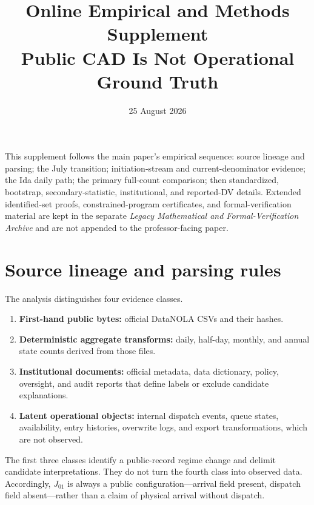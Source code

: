 \documentclass[11pt]{article}
\title{\vspace{-1.6em}\textbf{Online Empirical and Methods Supplement}\\[0.35em]
\large Public CAD Is Not Operational Ground Truth}
\author{}
\date{25 August 2026}
\begin{document}
\maketitle
\thispagestyle{plain}
\vspace{-1.2em}

\begin{plainbox}[title=Scope]
This supplement follows the main paper's empirical sequence: source lineage and parsing; the July transition; initiation-stream and current-denominator evidence; the Ida daily path; the primary full-count comparison; then standardized, bootstrap, secondary-statistic, institutional, and reported-DV details. Extended identified-set proofs, constrained-program certificates, and formal-verification material are kept in the separate \emph{Legacy Mathematical and Formal-Verification Archive} and are not appended to the professor-facing paper.
\end{plainbox}

\setcounter{tocdepth}{1}
\begingroup
\small
\tableofcontents
\endgroup
\newpage

\section{Source lineage and parsing rules}

The analysis distinguishes four evidence classes.
\begin{enumerate}
\item \textbf{First-hand public bytes:} official DataNOLA CSVs and their hashes.
\item \textbf{Deterministic aggregate transforms:} daily, half-day, monthly, and annual state counts derived from those files.
\item \textbf{Institutional documents:} official metadata, data dictionary, policy, oversight, and audit reports that define labels or exclude candidate explanations.
\item \textbf{Latent operational objects:} internal dispatch events, queue states, availability, entry histories, overwrite logs, and export transformations, which are not observed.
\end{enumerate}

The first three classes identify a public-record regime change and delimit candidate interpretations. They do not turn the fourth class into observed data. Accordingly, $J_{01}$ is always a public configuration---arrival field present, dispatch field absent---rather than a claim of physical arrival without dispatch.
\end{document}
